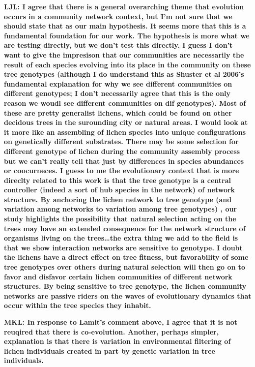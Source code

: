 \documentclass[11pt,twocolumn,twoside,lineno]{pnas-new}
\begin{document}
\textbf{LJL: I agree that there is a general overarching theme that
  evolution occurs in a community network context, but I’m not sure
  that we should state that as our main hypothesis. It seems more that
  this is a fundamental foundation for our work. The hypothesis is
  more what we are testing directly, but we don’t test this
  directly. I guess I don’t want to give the impresison that our
  communities are necessarily the result of each species evolving into
  its place in the community on these tree genotypes (although I do
  understand this as Shuster et al 2006’s fundamental explanation for
  why we see different communities on different genotypes; I don’t
  necessarily agree that this is the only reason we woudl see
  different communities on dif genotypes). Most of these are pretty
  generalist lichens, which could be found on other decidous trees in
  the surounding city or natural areas. I would look at it more like
  an assembling of lichen species into unique configurations on
  genetically different substrates. There may be some selection for
  different genotype of lichen during the community assembly process
  but we can’t really tell that just by differences in species
  abundances or coocurneces. I guess to me the evolutionary context
  that is more direclty related to this work is that the tree genotype
  is a central controller (indeed a sort of hub species in the
  network) of network structure. By anchoring the lichen network to
  tree genotype (and variation among networks to variation among tree
  genotypes) , our study highlights the possibility that natural
  selection acting on the trees may have an extended consequence for
  the network structure of organisms living on the trees…the extra
  thing we add to the field is that we show interaction networks are
  sensitive to genotype. I doubt the lichens have a direct effect on
  tree fitness, but favorability of some tree genotypes over others
  during natural selection will then go on to favor and disfavor
  certain lichen communities of different network structures. By being
  sensitive to tree genotype, the lichen community networks are
  passive riders on the waves of evolutionary dynamics that occur
  within the tree species they inhabit.}

\textbf{MKL: In response to Lamit's comment above, I agree that it is
  not reuqired that there is co-evolution. Another, perhaps simpler,
  explanation is that there is variation in environmental filtering of
  lichen individuals created in part by genetic variation in tree
  individuals.}
\end{document}
